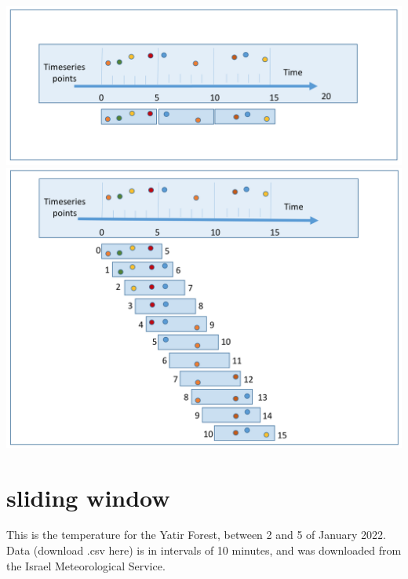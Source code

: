 \documentclass[
  letterpaper,
  DIV=11,
  numbers=noendperiod,
  oneside]{scrreprt}
\begin{document}
\includegraphics{smoothing/5sec_tumbling_window.png}
\includegraphics{smoothing/5sec_moving_window.png}

\hypertarget{sliding-window}{%
\chapter{sliding window}\label{sliding-window}}

This is the temperature for the Yatir Forest, between 2 and 5 of January
2022. Data (download .csv here) is in intervals of 10 minutes, and was
downloaded from the Israel Meteorological Service.
\end{document}

